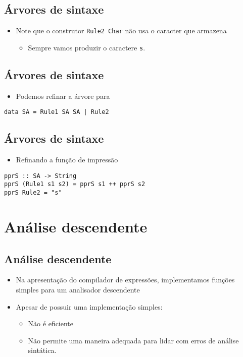 \documentclass[11pt]{article}
\begin{document}
\subsection*{Árvores de sintaxe}
\label{sec:org226edba}

\begin{itemize}
\item Note que o construtor \texttt{Rule2 Char} não usa o caracter que armazena
\begin{itemize}
\item Sempre vamos produzir o caractere \texttt{s}.
\end{itemize}
\end{itemize}
\subsection*{Árvores de sintaxe}
\label{sec:org306864d}

\begin{itemize}
\item Podemos refinar a árvore para
\end{itemize}

\begin{verbatim}
data SA = Rule1 SA SA | Rule2
\end{verbatim}
\subsection*{Árvores de sintaxe}
\label{sec:orge5d9b8a}

\begin{itemize}
\item Refinando a função de impressão
\end{itemize}

\begin{verbatim}
pprS :: SA -> String
pprS (Rule1 s1 s2) = pprS s1 ++ pprS s2
pprS Rule2 = "s"
\end{verbatim}
\section*{Análise descendente}
\label{sec:orga40909b}

\subsection*{Análise descendente}
\label{sec:orgbd70ae8}

\begin{itemize}
\item Na apresentação do compilador de expressões, implementamos funções simples para um analisador descendente

\item Apesar de possuir uma implementação simples:
\begin{itemize}
\item Não é eficiente
\item Não permite uma maneira adequada para lidar com erros de análise sintática.
\end{itemize}
\end{itemize}
\end{document}
